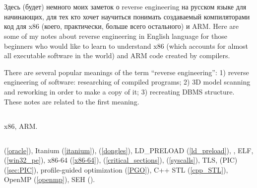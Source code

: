\section{}

\IFRU
{Здесь (будет) немного моих заметок о \gls{reverse engineering} на русском языке для начинающих, 
для тех кто хочет научиться понимать создаваемый \CCpp компиляторами код для x86 (коего, 
практически, больше всего остального) и ARM.}
{Here are some of my notes about \gls{reverse engineering} in English language for 
those beginners who would like to learn to understand x86 (which accounts for almost 
all executable software in the world) and ARM code created by \CCpp compilers.}

{There are several popular meanings of the term ``\gls{reverse engineering}'': 
1) reverse engineering of software: researching of compiled programs;
2) 3D model scanning and reworking in order to make a copy of it;
3) recreating \ac{DBMS} structure.
These notes are related to the first meaning.}

\subsection*{}

x86, ARM.

\subsection*{}

\oracle (\ref{oracle}),
Itanium (\ref{itanium}),
 (\ref{dongles}), 
LD\_PRELOAD (\ref{ld_preload}),
, 
\ac{ELF},
 (\ref{win32_pe}),
x86-64 (\ref{x86-64}),
 (\ref{critical_sections}),
 (\ref{syscalls}), 
\ac{TLS},
 (\ac{PIC}) (\ref{sec:PIC}), 
profile-guided optimization (\ref{PGO}),
C++ STL (\ref{cpp_STL}),
OpenMP (\ref{openmp}),
SEH (\label{sec:SEH}).

